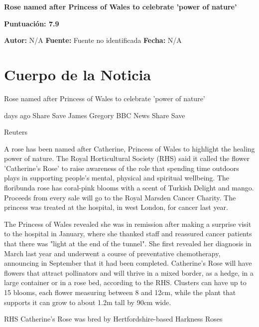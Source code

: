 \documentclass[10pt,a4paper]{article}
\begin{document}
\begin{center}
    {\Huge\bfseries Rose named after Princess of Wales to celebrate 'power of nature'\par}
    \vspace{0.5em}
    {\large\bfseries Puntuación: 7.9\par}
\end{center}
\vspace{1em}

\noindent\textbf{Autor:} N/A \hfill \textbf{Fuente:} Fuente no identificada \hfill \textbf{Fecha:} N/A\par
\vspace{1em}

\section*{Cuerpo de la Noticia}
\setlength{\parskip}{1em}
\setlength{\parindent}{0em}
Rose named after Princess of Wales to celebrate 'power of nature'
\par{} days ago Share Save James Gregory BBC News Share Save
\par\medskip
Reuters
\par\medskip
A rose has been named after Catherine, Princess of Wales to highlight the healing power of nature. The Royal Horticultural Society (RHS) said it called the flower 'Catherine's Rose' to raise awareness of the role that spending time outdoors plays in supporting people's mental, physical and spiritual wellbeing. The floribunda rose has coral-pink blooms with a scent of Turkish Delight and mango. Proceeds from every sale will go to the Royal Marsden Cancer Charity. The princess was treated at the hospital, in west London, for cancer last year.
\par\medskip
The Princess of Wales revealed she was in remission after making a surprise visit to the hospital in January, where she thanked staff and reassured cancer patients that there was "light at the end of the tunnel". She first revealed her diagnosis in March last year and underwent a course of preventative chemotherapy, announcing in September that it had been completed. Catherine's Rose will have flowers that attract pollinators and will thrive in a mixed border, as a hedge, in a large container or in a rose bed, according to the RHS. Clusters can have up to 15 blooms, each flower measuring between 8 and 12cm, while the plant that supports it can grow to about 1.2m tall by 90cm wide.
\par\medskip
RHS Catherine's Rose was bred by Hertfordshire-based Harkness Roses
\vspace{1em}
\end{document}
